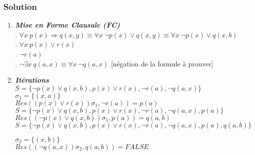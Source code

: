     \subsubsection*{Solution}
     \begin{enumerate}

   \item\textbf{\textit{ Mise en Forme Clausale (FC)}} \\
     . $\forall x \ p(x) \Rightarrow q(x, y) \equiv \forall x \ \neg p(x) \lor q(x,y) \equiv \forall x \ \neg p(x) \lor q(x,b)  $ \\
     . $\forall x \ p(x) \lor r(x) $ \\
     . $\neg r(a) $ \\
     . $\neg \exists x \ q(a, x) \equiv \forall x \ \neg q(a,x) $ [négation de la formule à prouver] \\


    \item\textbf{\textit{Itérations }} \\
    $ S = \{ \neg p(x) \lor q(x,b), p(x) \lor r(x), \neg r(a), \neg q(a,x) \} $\\
    $ \sigma_{1} = \{ (x,a) \}$\\
    $ Res( (p(x) \lor r(x))\sigma_{1}, \neg r(a) ) = p(a) $\\
    $ S = \{ \neg p(x) \lor q(x,b), p(x) \lor r(x), \neg r(a), \neg q(a,x), p(a) \} $\\
    $ Res( (\neg p(x) \lor q(x,b))\sigma_{1}, p(a) )= q(a,b) $\\
    $ S = \{ \neg p(x) \lor q(x,b), p(x) \lor r(x), \neg r(a), \neg q(a,x), p(a), q(a,b) \} $

    \noindent $ \sigma_{2} = \{ (x,b) \}$\\
    $ Res( (\neg q(a,x))\sigma_{2}, q(a,b) )= FALSE $\\


\end{enumerate}
